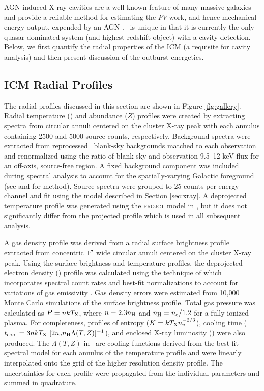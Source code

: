 \documentclass[useAMS,usenatbib]{mn2e}
\begin{document}
AGN induced X-ray cavities are a well-known feature of many massive
galaxies and provide a reliable method for estimating the $PV$ work,
and hence mechanical energy output, expended by an AGN \citep[see][for
  a review]{mcnamrev}. \irs\ is unique in that it is currently the
only quasar-dominated system (and highest redshift object) with a
cavity detection. Below, we first quantify the radial properties of
the ICM (a requisite for cavity analysis) and then present discussion
of the outburst energetics.

\subsection{ICM Radial Profiles}

The radial profiles discussed in this section are shown in Figure
\ref{fig:gallery}. Radial temperature (\tx) and abundance ($Z$)
profiles were created by extracting spectra from circular annuli
centered on the cluster X-ray peak with each annulus containing 2500
and 5000 source counts, respectively. Background spectra were
extracted from reprocessed \caldb\ blank-sky backgrounds matched to
each observation and renormalized using the ratio of blank-sky and
observation 9.5--12 keV flux for an off-axis, source-free region. A
fixed background component was included during spectral analysis to
account for the spatially-varying Galactic foreground (see
\citealt{2005ApJ...628..655V} and \citealt{xrayband} for
method). Source spectra were grouped to 25 counts per energy channel
and fit using the model described in Section \ref{sec:xray}. A
deprojected temperature profile was generated using the
\textsc{projct} model in \xspec, but it does not significantly differ
from the projected profile which is used in all subsequent analysis.

A gas density profile was derived from a radial surface brightness
profile extracted from concentric $1\rm{^\prime}\hskip -0.1em\rm{^\prime}$ wide circular annuli
centered on the cluster X-ray peak. Using the surface brightness and
temperature profiles, the deprojected electron density (\nelec)
profile was calculated using the technique of \citet{kriss83} which
incorporates spectral count rates and best-fit normalizations to
account for variations of gas emissivity \citep[see][for method
  details]{accept}. Gas density errors were estimated from 10,000
Monte Carlo simulations of the surface brightness profile. Total gas
pressure was calculated as $P = n kT_{\rm{X}}$, where $n = 2.3 n_{\rm{H}}$ and $n_{\rm{H}} =
n_{\rm{e}}/1.2$ for a fully ionized plasma. For completeness, profiles of
entropy ($K = kT_{\rm{X}}n_{\rm{e}}^{-2/3}$), cooling time ($t_{\rm{cool}} =
3nkT_{\rm{X}}~[2n_{\rm{e}} n_{\rm{H}} \Lambda(T,Z)]^{-1}$), and enclosed X-ray luminosity
(\lx) were also produced. The $\Lambda(T,Z)$ in \tcool\ are cooling
functions derived from the best-fit spectral model for each annulus of
the temperature profile and were linearly interpolated onto the grid
of the higher resolution density profile. The uncertainties for each
profile were propagated from the individual parameters and summed in
quadrature.
\end{document}
